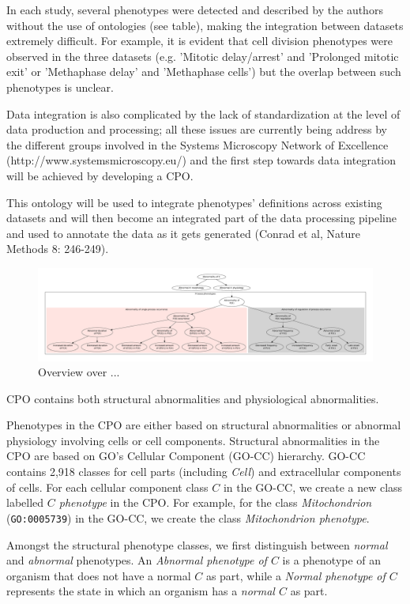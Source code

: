 \documentclass{bioinfo}
\begin{document}
In each study, several phenotypes were detected and described by the
authors without the use of ontologies (see table), making the
integration between datasets extremely difficult. For example, it is
evident that cell division phenotypes were observed in the three
datasets (e.g. 'Mitotic delay/arrest' and 'Prolonged mitotic exit' or
'Methaphase delay' and 'Methaphase cells') but the overlap between
such phenotypes is unclear.

Data integration is also complicated by the lack of standardization at
the level of data production and processing; all these issues are
currently being address by the different groups involved in the
Systems Microscopy Network of Excellence
(http://www.systemsmicroscopy.eu/) and the first step towards data
integration will be achieved by developing a CPO.

This ontology will be used to integrate phenotypes' definitions across
existing datasets and will then become an integrated part of the data
processing pipeline and used to annotate the data as it gets generated
(Conrad et al, Nature Methods 8: 246-249).

\begin{figure}[h]
  \centering
  \includegraphics[width=\textwidth,
  height=.33\textheight]{overview.pdf}
  \caption{Overview over ...\label{fig:overview}}
\end{figure}

CPO contains both structural abnormalities and physiological
abnormalities.

Phenotypes in the CPO are either based on structural abnormalities or
abnormal physiology involving cells or cell components. Structural
abnormalities in the CPO are based on GO's Cellular Component (GO-CC)
hierarchy. GO-CC contains 2,918 classes for cell parts (including {\em
  Cell}) and extracellular components of cells. For each cellular
component class $C$ in the GO-CC, we create a new class labelled {\em
  $C$ phenotype} in the CPO. For example, for the class {\em
  Mitochondrion} ({\tt GO:0005739}) in the GO-CC, we create the class
{\em Mitochondrion phenotype}.

Amongst the structural phenotype classes, we first distinguish between
{\em normal} and {\em abnormal} phenotypes. An {\em Abnormal phenotype
  of $C$} is a phenotype of an organism that does not have a normal
$C$ as part, while a {\em Normal phenotype of $C$} represents the
state in which an organism has a {\em normal $C$} as part.
\end{document}
